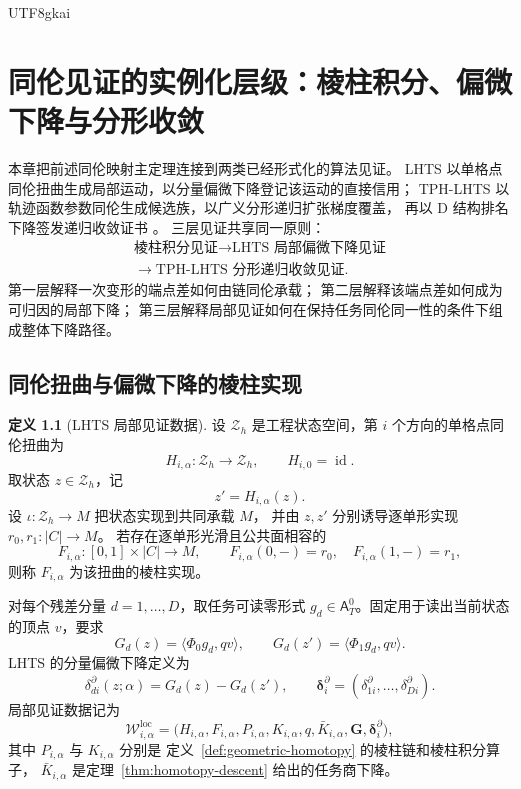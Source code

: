 \documentclass[12pt]{report}
\theoremstyle{definition}
\newtheorem{definition}{定义}[chapter]
\newcommand{\id}{\operatorname{id}}
\begin{document}
\begin{CJK*}{UTF8}{gkai}
\chapter{同伦见证的实例化层级：棱柱积分、偏微下降与分形收敛}
\label{sec:witness-instance-hierarchy}

本章把前述同伦映射主定理连接到两类已经形式化的算法见证。
LHTS 以单格点同伦扭曲生成局部运动，以分量偏微下降登记该运动的直接信用；
TPH-LHTS 以轨迹函数参数同伦生成候选族，以广义分形递归扩张梯度覆盖，
再以 D 结构排名下降签发递归收敛证书
\cite{lhts,tphlhts}。
三层见证共享同一原则：
\[
\boxed{
\begin{gathered}
\text{棱柱积分见证}
\longrightarrow
\text{LHTS 局部偏微下降见证}
\\
\longrightarrow
\text{TPH-LHTS 分形递归收敛见证}.
\end{gathered}}
\]
第一层解释一次变形的端点差如何由链同伦承载；
第二层解释该端点差如何成为可归因的局部下降；
第三层解释局部见证如何在保持任务同伦同一性的条件下组成整体下降路径。

\section{同伦扭曲与偏微下降的棱柱实现}

\begin{definition}[LHTS 局部见证数据]
\label{def:lhts-local-witness-data}
设 \(\mathcal Z_h\) 是工程状态空间，第 \(i\) 个方向的单格点同伦扭曲为
\[
H_{i,\alpha}:\mathcal Z_h\longrightarrow\mathcal Z_h,
\qquad H_{i,0}=\id.
\]
取状态 \(z\in\mathcal Z_h\)，记
\[
z'=H_{i,\alpha}(z).
\]
设 \(\iota:\mathcal Z_h\to M\) 把状态实现到共同承载 \(M\)，
并由 \(z,z'\) 分别诱导逐单形实现 \(r_0,r_1:|C|\to M\)。
若存在逐单形光滑且公共面相容的
\[
F_{i,\alpha}:[0,1]\times|C|\longrightarrow M,
\qquad
F_{i,\alpha}(0,-)=r_0,\quad
F_{i,\alpha}(1,-)=r_1,
\]
则称 \(F_{i,\alpha}\) 为该扭曲的棱柱实现。

对每个残差分量 \(d=1,\ldots,D\)，取任务可读零形式
\(g_d\in\mathsf A_T^0\)。固定用于读出当前状态的顶点 \(v\)，要求
\[
G_d(z)=\langle\Phi_0g_d,qv\rangle,
\qquad
G_d(z')=\langle\Phi_1g_d,qv\rangle.
\]
LHTS 的分量偏微下降定义为
\[
\delta_{di}^{\partial}(z;\alpha)
=G_d(z)-G_d(z'),
\qquad
\boldsymbol\delta_i^\partial
=(\delta_{1i}^\partial,\ldots,\delta_{Di}^\partial).
\]
局部见证数据记为
\[
\mathcal W_{i,\alpha}^{\mathrm{loc}}
=
\bigl(
H_{i,\alpha},F_{i,\alpha},P_{i,\alpha},
K_{i,\alpha},q,\bar K_{i,\alpha},
\mathbf G,\boldsymbol\delta_i^\partial
\bigr),
\]
其中 \(P_{i,\alpha}\) 与 \(K_{i,\alpha}\) 分别是
定义~\ref{def:geometric-homotopy} 的棱柱链和棱柱积分算子，
\(\bar K_{i,\alpha}\) 是定理~\ref{thm:homotopy-descent} 给出的任务商下降。
\end{definition}


\end{CJK*}
\end{document}
